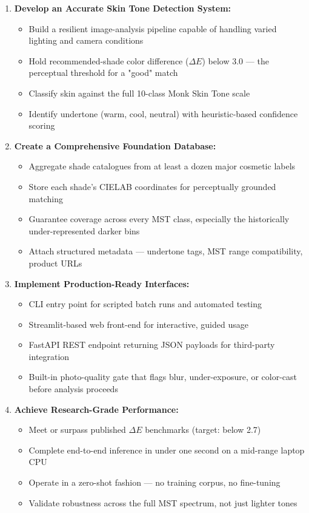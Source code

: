 \begin{enumerate}
    \item \textbf{Develop an Accurate Skin Tone Detection System:}
    \begin{itemize}
        \item Build a resilient image-analysis pipeline capable of handling varied lighting and camera conditions
        \item Hold recommended-shade color difference ($\Delta E$) below 3.0 — the perceptual threshold for a "good" match
        \item Classify skin against the full 10-class Monk Skin Tone scale
        \item Identify undertone (warm, cool, neutral) with heuristic-based confidence scoring
    \end{itemize}
    
    \item \textbf{Create a Comprehensive Foundation Database:}
    \begin{itemize}
        \item Aggregate shade catalogues from at least a dozen major cosmetic labels
        \item Store each shade's CIELAB coordinates for perceptually grounded matching
        \item Guarantee coverage across every MST class, especially the historically under-represented darker bins
        \item Attach structured metadata — undertone tags, MST range compatibility, product URLs
    \end{itemize}
    
    \item \textbf{Implement Production-Ready Interfaces:}
    \begin{itemize}
        \item CLI entry point for scripted batch runs and automated testing
        \item Streamlit-based web front-end for interactive, guided usage
        \item FastAPI REST endpoint returning JSON payloads for third-party integration
        \item Built-in photo-quality gate that flags blur, under-exposure, or color-cast before analysis proceeds
    \end{itemize}
    
    \item \textbf{Achieve Research-Grade Performance:}
    \begin{itemize}
        \item Meet or surpass published $\Delta E$ benchmarks (target: below 2.7)
        \item Complete end-to-end inference in under one second on a mid-range laptop CPU
        \item Operate in a zero-shot fashion — no training corpus, no fine-tuning
        \item Validate robustness across the full MST spectrum, not just lighter tones
    \end{itemize}
\end{enumerate}


